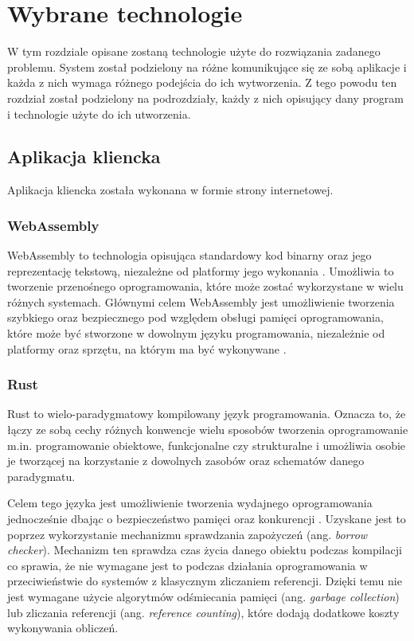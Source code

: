 \chapter{Wybrane technologie}

W tym rozdziale opisane zostaną technologie użyte do rozwiązania zadanego problemu.
System został podzielony na różne komunikujące się ze sobą aplikacje i każda z nich
wymaga różnego podejścia do ich wytworzenia. Z tego powodu ten rozdział został podzielony
na podrozdziały, każdy z nich opisujący dany program i technologie użyte do ich
utworzenia.

\section{Aplikacja kliencka}
Aplikacja kliencka została wykonana w formie strony internetowej.

\subsection*{WebAssembly}
WebAssembly\cite{webassembly} to technologia opisująca standardowy kod binarny oraz jego reprezentację tekstową,
niezależne od platformy jego wykonania \cite{mdn:wasm, wasm:standard}. Umożliwia to
tworzenie przenośnego oprogramowania, które może zostać wykorzystane w wielu różnych systemach.
Głównymi celem WebAssembly jest umożliwienie tworzenia szybkiego oraz bezpiecznego pod względem
obsługi pamięci oprogramowania, które może być stworzone w dowolnym języku programowania, 
niezależnie od platformy oraz sprzętu, na którym ma być wykonywane \cite{wasm:standard}.

\subsection*{Rust}
Rust\cite{rust} to wielo-paradygmatowy kompilowany język programowania. Oznacza to, że łączy ze sobą cechy różnych
konwencje wielu sposobów tworzenia oprogramowanie m.in. programowanie obiektowe, funkcjonalne
czy strukturalne i umożliwia osobie je tworzącej na korzystanie z dowolnych zasobów oraz
schematów danego paradygmatu. 

Celem tego języka jest umożliwienie tworzenia wydajnego oprogramowania jednocześnie
dbając o bezpieczeństwo pamięci oraz konkurencji \cite{infoworld:what_is_rust}. 
Uzyskane jest to poprzez wykorzystanie mechanizmu sprawdzania zapożyczeń (ang. \textit{borrow checker}).
Mechanizm ten sprawdza czas życia danego obiektu podczas kompilacji co sprawia, że nie wymagane
jest to podczas działania oprogramowania w przeciwieństwie do systemów z klasycznym zliczaniem referencji.
Dzięki temu nie jest wymagane użycie algorytmów odśmiecania pamięci
(ang. \textit{garbage collection}) lub zliczania referencji (ang. \textit{reference counting}), 
które dodają dodatkowe koszty wykonywania obliczeń.

